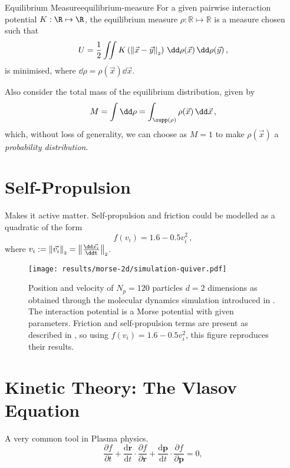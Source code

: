 \begin{definition}{Equilibrium Measure}{equilibrium-measure}
  For a given pairwise interaction potential $K: \R \mapsto \R$, the equilibrium measure $\rho: \mathbb{R} \mapsto \mathbb{R}$ is a measure chosen such that
  $$U = \frac{1}{2} \iint K\left(\norm{\vec{x} - \vec{y}}\right) \,\dd\rho(\vec{x})\,\dd\rho(\vec{y})\,,$$
  is minimised, where $\dd\rho = \rho(\vec{x})\dd\vec{x}$.
\end{definition}
Also consider the total mass of the equilibrium distribution, given by
\begin{equation}
  M = \int \dd\rho = \int_{\supp(\rho)} \rho(\vec{x}) \,\dd\vec{x}\,,
  \label{eq:measure-mass}
\end{equation}
which, without loss of generality, we can choose as $M = 1$ to make $\rho(\vec{x})$ a \textit{probability distribution}.

\section{Self-Propulsion}
Makes it active matter.
Self-propulsion and friction could be modelled as a quadratic of the form
$$f(v_i) = 1.6 - 0.5 v_i^2\,,$$
where $v_i := \norm{\vec{v_i}} = \norm{\frac{\dd\vec{x_i}}{\ddt}}$.

\begin{figure}[H]
  \centering
  \label{fig:simulation-quiver-illustration}
  \texttt{[image: results/morse-2d/simulation-quiver.pdf]}
  \caption[Quiver plot of 120 particles in 2D interacting through the Morse potential]{Position and velocity of $N_p = 120$ particles $d = 2$ dimensions as obtained through the molecular dynamics simulation introduced in . The interaction potential is a Morse potential with given parameters. Friction and self-propulsion terms are present as described in \cite{2006-self-propelled}, so using $f(v_i) = 1.6 - 0.5 v_i^2$, this figure reproduces their results.}
\end{figure}

\hierKoennteIhreWerbungStehen


\section{Kinetic Theory: The Vlasov Equation}
A very common tool in Plasma physics.
$$\frac{\partial f}{\partial t}+{\frac {\mathrm {d} \mathbf {r} }{\mathrm {d} t}}\cdot {\frac {\partial f}{\partial \mathbf {r} }}+{\frac {\mathrm {d} \mathbf {p} }{\mathrm {d} t}}\cdot {\frac {\partial f}{\partial \mathbf {p} }}=0,$$

